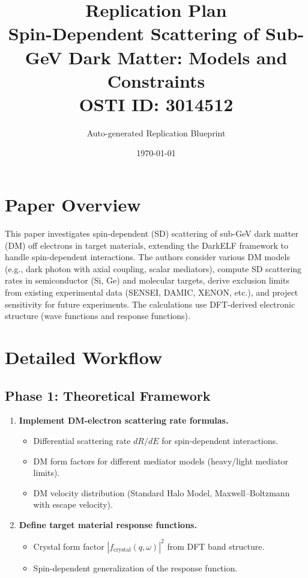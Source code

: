 \documentclass[11pt,a4paper]{article}
\title{\textbf{Replication Plan}\\[0.5em]
\large Spin-Dependent Scattering of Sub-GeV Dark Matter: Models and Constraints\\[0.3em]
\normalsize OSTI ID: 3014512}
\author{Auto-generated Replication Blueprint}
\date{\today}
\begin{document}
\maketitle
\tableofcontents
\newpage

\section{Paper Overview}
This paper investigates spin-dependent (SD) scattering of sub-GeV dark matter (DM) off electrons in target materials, extending the DarkELF framework to handle spin-dependent interactions. The authors consider various DM models (e.g., dark photon with axial coupling, scalar mediators), compute SD scattering rates in semiconductor (Si, Ge) and molecular targets, derive exclusion limits from existing experimental data (SENSEI, DAMIC, XENON, etc.), and project sensitivity for future experiments. The calculations use DFT-derived electronic structure (wave functions and response functions).

\section{Detailed Workflow}

\subsection{Phase 1: Theoretical Framework}
\begin{enumerate}[label=\textbf{1.\arabic*}]
  \item \textbf{Implement DM-electron scattering rate formulas.}
    \begin{itemize}
      \item Differential scattering rate $dR/dE$ for spin-dependent interactions.
      \item DM form factors for different mediator models (heavy/light mediator limits).
      \item DM velocity distribution (Standard Halo Model, Maxwell--Boltzmann with escape velocity).
    \end{itemize}
  \item \textbf{Define target material response functions.}
    \begin{itemize}
      \item Crystal form factor $|f_{\text{crystal}}(q, \omega)|^2$ from DFT band structure.
      \item Spin-dependent generalization of the response function.
    \end{itemize}
\end{enumerate}
\end{document}
